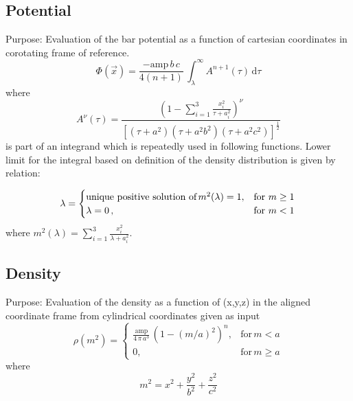 \documentclass[a4paper,11pt]{article}
\begin{document}
		\subsection{Potential} %
			Purpose: Evaluation of the bar potential as a function of cartesian coordinates in corotating frame of reference. \\
   		\begin{equation}
   		\Phi(\vec{x}) = \frac{-\mathrm{amp}\,b\,c}{4(n+1)}\,\int_{\lambda}^{\infty} A^{n+1}(\tau)\,\mathrm{d} \tau
   		\end{equation}
   			where
		\begin{equation}
		A^{\nu}(\tau) = \frac{\left(1- \sum_{i=1}^{3} \frac{x_i^2}{\tau + a_i^2}\right)^{\nu}}{[(\tau + a^2)(\tau + a^2b^2)(\tau + a^2c^2)]^\frac{1}{2}}
		\end{equation}
   			is part of an integrand which is repeatedly used in following functions. Lower limit for the integral based on definition of the density distribution is given by relation:
 
		\begin{equation}
		\lambda = \begin{cases}
		\text{unique positive solution of} \, m^2(\lambda)=1, &  \text{for}\ m \geq 1\\
		\lambda = 0\,, & \text{for}\ m < 1
		\end{cases} \\
		\end{equation}
		where $ m^2(\lambda) = \sum_{i=1}^{3} \frac{x_i^2}{\lambda + a_i^2} $.	
	
		\subsection{Density} %
			Purpose: Evaluation of the density as a function of (x,y,z) in the aligned coordinate frame from cylindrical coordinates given as input\\
		\begin{equation*}
		\rho(m^2) = \begin{cases}
		\frac{\mathrm{amp}}{4\,\pi\,a^3}\,(1-(m/a)^2)^n, & \text{for}\, m < a \\
		0, & \text{for}\, m \geq a
		\end{cases}
		\end{equation*}
			where
		\begin{equation}
		m^2 = x^2 + \frac{y^2}{b^2}+\frac{z^2}{c^2}
		\end{equation}
		
\end{document}
